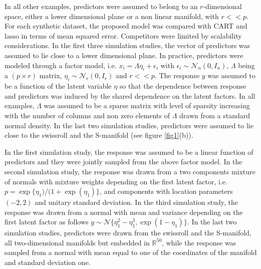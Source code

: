 \documentclass{article}
\newcommand{\Real}{\mathbb{R}}
\providecommand{\mc}[1]{\mathcal{#1}}
\begin{document}
In all other examples, predictors were assumed to belong to an $r$-dimensional space, either a lower dimensional plane or a non linear manifold, with $r<<p$. For each synthetic dataset, the proposed model was compared with CART and lasso in terms of mean squared error. Competitors were limited by scalability considerations. In the first three simulation studies, the vector of predictors was assumed to lie close to a lower dimensional plane. In practice,  predictors were modeled through a factor model, i.e. $x_i=\Lambda \eta_i + \epsilon_i$ with $\epsilon_i \sim \mc{N}_n(0,I_n)$, $\Lambda$ being a $(p \times r)$ matrix, $\eta_i \sim \mc{N}_r(0,I_r)$ and $r<<p$. The response $y$ was assumed to be a function of the latent variable $\eta$ so that  the dependence between response and predictors was induced by the shared dependence on the latent factors.  In all examples, $\Lambda$ was assumed to be a sparse matrix with level of sparsity increasing with the number of columns and non zero elements of $\Lambda$ drawn from a standard normal density. In the last two simulation studies, predictors were assumed to lie close to the swissroll and the S-manifold (see figure \ref{fig1}(b)).
%


In the first simulation study, the response was assumed to be a linear function of predictors and they were jointly sampled from the above factor model.  In the second simulation study,  the response was drawn from a two components mixture of normals with mixture weights depending on the first latent factor, i.e. $p=\exp\{\eta_1)/(1+\exp(\eta_1)\}$, and components with location parameters $(-2,2)$ and unitary standard deviation.  In the third simulation study, the response was drawn from a normal with mean and variance depending on the first latent factor as follows $y \sim \mc{N}\{\eta_1^2-\eta_1^3, \exp(1-\eta_1)\}$. In the last two simulation studies, predictors were drawn from the swissroll and the S-manifold, all two-dimensional manifolds but embedded in $\Real^{50}$, while the response was sampled from a normal with mean equal to one of the coordinates of the manifold and standard deviation one.
\end{document}

